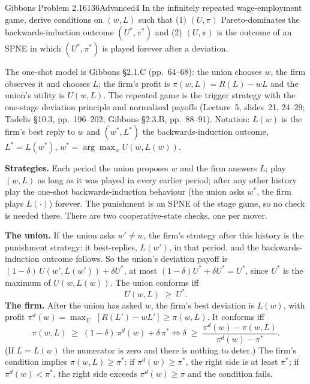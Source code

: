 \begin{exsol}{Gibbons Problem 2.16}{136}{Advanced}{4}
\asked In the infinitely repeated wage-employment game, derive conditions on $(w,L)$ such that
(1) $(U,\pi)$ Pareto-dominates the backwards-induction outcome $(U^*,\pi^*)$ and (2) $(U,\pi)$ is the outcome of
an SPNE in which $(U^*,\pi^*)$ is played forever after a deviation.

\method The one-shot model is Gibbons \S2.1.C (pp.~64--68): the union chooses $w$, the firm observes it and
chooses $L$; the firm's profit is $\pi(w,L) = R(L) - wL$ and the union's utility is $U(w,L)$. The repeated game is the
trigger strategy with the one-stage deviation principle and normalised payoffs (Lecture~5, slides~21, 24--29;
Tadelis \S10.3, pp.~196--202; Gibbons \S2.3.B, pp.~88--91). Notation: $L(w)$ is the firm's best reply to $w$ and
$(w^*, L^*)$ the backwards-induction outcome, $L^* = L(w^*)$, $w^* = \arg\max_w U(w, L(w))$.

\solution
\textbf{Strategies.} Each period the union proposes $w$ and the firm answers $L$; play $(w,L)$ as long as it was played
in every earlier period; after any other history play the one-shot backwards-induction behaviour (the union asks $w^*$,
the firm plays $L(\cdot)$) forever. The punishment is an SPNE of the stage game, so no check is needed there. There are two
cooperative-state checks, one per mover.

\textbf{The union.} If the union asks $w' \ne w$, the firm's strategy after this history is the punishment strategy:
it best-replies, $L(w')$, in that period, and the backwards-induction outcome follows. So the union's deviation payoff is
$(1-\delta)\,U(w', L(w')) + \delta U^*$, at most $(1-\delta)U^* + \delta U^* = U^*$, since $U^*$ is the maximum of $U(w, L(w))$. The union conforms iff
\[
  U(w,L) \;\ge\; U^* .
\]
\textbf{The firm.} After the union has asked $w$, the firm's best deviation is $L(w)$, with profit
$\pi^d(w) = \max_{L'}\,[R(L') - wL'] \ge \pi(w,L)$. It conforms iff
\[
  \pi(w,L) \;\ge\; (1-\delta)\,\pi^d(w) + \delta\,\pi^*
  \iff \delta \;\ge\; \frac{\pi^d(w) - \pi(w,L)}{\pi^d(w) - \pi^*} .
\]
(If $L = L(w)$ the numerator is zero and there is nothing to deter.) The firm's condition implies $\pi(w,L) \ge \pi^*$: if
$\pi^d(w) \ge \pi^*$, the right side is at least $\pi^*$; if $\pi^d(w) < \pi^*$, the right side exceeds $\pi^d(w) \ge \pi$ and the condition fails.


\end{exsol}
